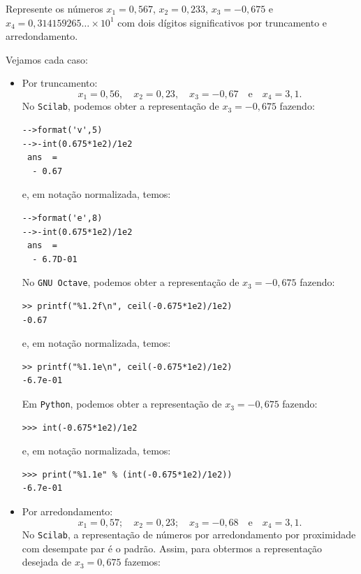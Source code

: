 \begin{ex} Represente os números $x_1 = 0,567$, $x_2 = 0,233$, $x_3 = -0,675$ e $x_4 = 0,314159265 \ldots \times 10^1$ com dois dígitos significativos por truncamento e arredondamento.
\end{ex}
\begin{sol} Vejamos cada caso:
  \begin{itemize}
  \item Por truncamento:
    \begin{equation}
      x_1=0,56,\quad x_2=0,23,\quad x_3=-0,67\quad\mbox{e}\quad x_4 = 3,1.
    \end{equation}
\ifisscilab
No \verb+Scilab+, podemos obter a representação de $x_3 = -0,675$ fazendo:
\begin{verbatim}
-->format('v',5)
-->-int(0.675*1e2)/1e2
 ans  =
  - 0.67
\end{verbatim}
e, em notação normalizada, temos:
\begin{verbatim}
-->format('e',8)
-->-int(0.675*1e2)/1e2
 ans  =
  - 6.7D-01
\end{verbatim}
\fi
\ifisoctave
No \verb+GNU Octave+, podemos obter a representação de $x_3 = -0,675$ fazendo:
\begin{verbatim}
>> printf("%1.2f\n", ceil(-0.675*1e2)/1e2)
-0.67
\end{verbatim}
e, em notação normalizada, temos:
\begin{verbatim}
>> printf("%1.1e\n", ceil(-0.675*1e2)/1e2)
-6.7e-01
\end{verbatim}
\fi
\ifispython
Em \verb+Python+, podemos obter a representação de $x_3 = -0,675$ fazendo:
\begin{verbatim}
>>> int(-0.675*1e2)/1e2
\end{verbatim}
e, em notação normalizada, temos:
\begin{verbatim}
>>> print("%1.1e" % (int(-0.675*1e2)/1e2))
-6.7e-01
\end{verbatim}
\fi
\item Por arredondamento:
\begin{equation}
   x_1=0,57;\quad x_2=0,23;\quad x_3=-0,68\quad\mbox{e}\quad x_4 = 3,1.
\end{equation}
\ifisscilab
No \verb+Scilab+, a representação de números por arredondamento por proximidade com desempate par é o padrão. Assim, para obtermos a representação desejada de $x_3 = 0,675$ fazemos:

\end{itemize}
\end{sol}
